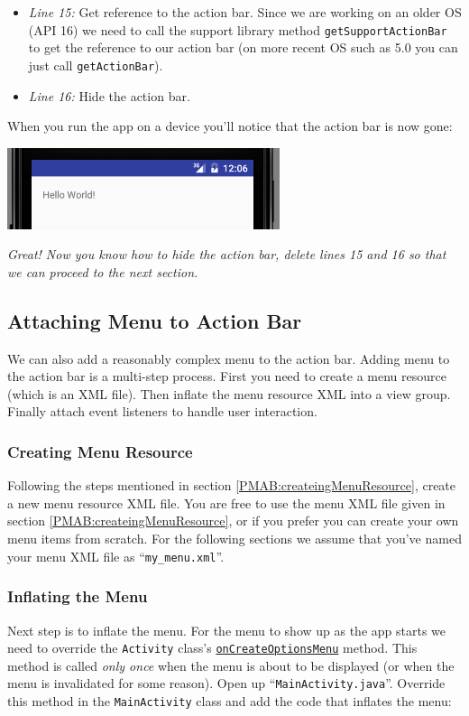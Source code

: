 \begin{itemize}
	\item \textit{Line 15:} Get reference to the action bar. Since we are working on an older OS (API 16) we need to call the support library method \texttt{getSupportActionBar} to get the reference to our action bar (on more recent OS such as 5.0 you can just call \texttt{getActionBar}).
	
	\item \textit{Line 16:} Hide the action bar.
\end{itemize}

When you run the app on a device you'll notice that the action bar is now gone:

\begin{center}
	\includegraphics[scale=0.4]{chapters/ch07/images/29}
\end{center}

\vskip 4mm
\textit{Great! Now you know how to hide the action bar, delete lines 15 and 16 so that we can proceed to the next section.}

\subsection{Attaching Menu to Action Bar}
We can also add a reasonably complex menu to the action bar. Adding menu to the action bar is a multi-step process. First you need to create a menu resource (which is an XML file). Then inflate the menu resource XML into a view group. Finally attach event listeners to handle user interaction.

\subsubsection{Creating Menu Resource}
Following the steps mentioned in section \ref{PMAB:createingMenuResource}, create a new menu resource XML file. You are free to use the menu XML file given in section \ref{PMAB:createingMenuResource}, or if you prefer you can create your own menu items from scratch. For the following sections we assume that you've named your menu XML file as ``\texttt{my\_menu.xml}''.

\subsubsection{Inflating the Menu}
Next step is to inflate the menu. For the menu to show up as the app starts we need to override the \texttt{Activity} class's \href{https://developer.android.com/reference/android/app/Activity.html#onCreateOptionsMenu(android.view.Menu)}{\texttt{onCreateOptionsMenu}} method. This method is called \textit{only once} when the menu is about to be displayed (or when the menu is invalidated for some reason). Open up ``\texttt{MainActivity.java}''. Override this method in the \texttt{MainActivity} class and add the code that inflates the menu:


